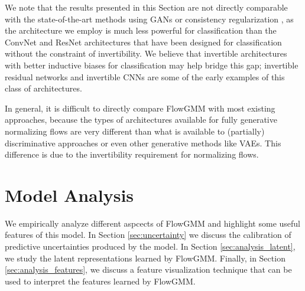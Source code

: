 \documentclass{article}
\newcommand{\method}{FlowGMM\xspace}
\begin{document}
We note that the results presented in this Section are not directly comparable with the state-of-the-art
methods using GANs or consistency regularization
\citep[see e.g.][]{laine2016temporal,dai2017,athiwaratkun2018there, berthelot2019mixmatch}, as the architecture we employ is much less powerful for classification than the ConvNet and ResNet architectures that have been designed for classification without the constraint of invertibility. We believe that invertible architectures with better inductive biases for classification may help bridge this gap;  invertible residual networks \citep{behrmann2018invertible, chen2019residual} and invertible CNNs \citep{finzi2019invertible} are some of the early examples of this class of architectures. 

In general, it is difficult to directly compare \method with most existing approaches, because the types of architectures available for fully generative normalizing flows are very different than what is available to (partially) discriminative approaches or even other generative methods like VAEs. This difference is due to the invertibility requirement for normalizing flows.

\section{Model Analysis}
\label{sec:analysis}

We empirically analyze different aspcects of \method and highlight some useful features of this model.
In Section \ref{sec:uncertainty} we discuss the calibration of predictive uncertainties produced by the model.
In Section \ref{sec:analysis_latent}, we study the latent representations learned by \method. 
Finally, in Section \ref{sec:analysis_features}, we discuss a feature visualization technique that can be used to interpret the features learned by \method.
\end{document}

